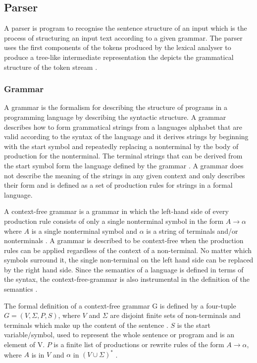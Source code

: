 \subsection{Parser}

A parser is program to recognise the sentence structure of an input which is the process of structuring an input text according to a given grammar. The parser uses the first components of the tokens produced by the lexical analyser to produce a tree-like intermediate representation the depicts the grammatical structure of the token stream \cite{aho2003compilers}.

\subsubsection{Grammar}

A grammar is the formalism for describing the structure of programs in a programming language by describing the syntactic structure. A grammar describes how to form grammatical strings from a languages alphabet that are valid according to the syntax of the language \cite{meduna2014formal} and it derives strings by beginning with the start symbol and repeatedly replacing a nonterminal by the body of production for the nonterminal. The terminal strings that can be derived from the start symbol form the language defined by the grammar \cite{aho2003compilers}. A grammar does not describe the meaning of the strings in any given context and only describes their form and is defined as a set of production rules for strings in a formal language. \newline \par

A context-free grammar is a grammar in which the left-hand side of every production rule consists of only a single nonterminal symbol in the form $ A \rightarrow \alpha$ where $A$ is a single nonterminal symbol and $\alpha$ is a string of terminals and/or nonterminals \cite{aho1971translations}. A grammar is described to be context-free when the production rules can be applied regardless of the context of a non-terminal. No matter which symbols surround it, the single non-terminal on the left hand side can be replaced by the right hand side. Since the semantics of a language is defined in terms of the syntax, the context-free-grammar is also instrumental in the definition of the semantics \cite{grune2012modern}. \newline \par

The formal definition of a context-free grammar G is defined by a four-tuple $G = (V, \varSigma, P, S)$, where $V$ and $\varSigma$ are disjoint finite sets of non-terminals and terminals which make up the content of the sentence \cite{aho1971translations}. $S$ is the start variable/symbol, used to represent the whole sentence or program and is an element of V. $P$ is a finite list of productions or rewrite rules of the form $ A \rightarrow \alpha$, where $A$ is in $V$ and $\alpha$ in $(V\cup\varSigma)^\ast$ \cite{backus1960report}.

